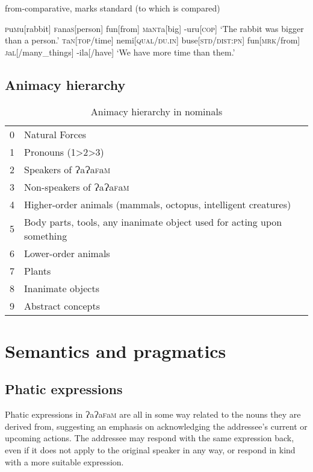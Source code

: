 \documentclass[a4paper,10pt,twoside,openright]{memoir}
\newcommand{\lang}{ɁaɁa\textsc{f}a\textsc{m}}
\begin{document}
from-comparative, marks standard (to which is compared)

\pex[interpartskip=3ex]
\a
\begingl
\textsc{p}u\textsc{m}u[rabbit]
\textsc{f}ana\textsc{s}[person]
fun[from]
\textsc{m}a\textsc{nt}a[big]
-uru[\textsc{cop}]
\glft `The rabbit was bigger than a person.'
\endgl
\a
\begingl
\textsc{t}a\textsc{n}[\textsc{top}/time]
nemi[\textsc{qual}/\textsc{du.in}]
buse[\textsc{std}/\textsc{dist:pn}]
fun[\textsc{mrk}/from]
\textsc{j}a\textsc{l}[/many\_things]
-ila[/have]
\glft `We have more time than them.'
\endgl
\xe

\section{Animacy hierarchy}

\begin{table}[ht]
    \centering
    \begin{tabular}{ll}
    0 & Natural Forces \\
    1 & Pronouns (1>2>3) \\
    2 & Speakers of \lang{} \\
    3 & Non-speakers of \lang{} \\
    4 & Higher-order animals (mammals, octopus, intelligent creatures) \\
    5 & \parbox[t]{7cm}{Body parts, tools, any inanimate object used for acting upon something} \\
    6 & Lower-order animals \\
    7 & Plants \\
    8 & Inanimate objects \\
    9 & Abstract concepts 
    \end{tabular}
    \caption{Animacy hierarchy in nominals}
    \label{tab:hierarchy}
\end{table}

\chapter{Semantics and pragmatics}
\section{Phatic expressions}

Phatic expressions in \lang{} are all in some way related to the nouns they are derived from, suggesting an emphasis on acknowledging the addressee's current or upcoming actions. The addressee may respond with the same expression back, even if it does not apply to the original speaker in any way, or respond in kind with a more suitable expression.
\end{document}
